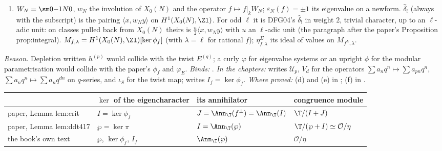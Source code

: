 \begin{convention}
\begin{enumerate}[label=(\alph*)]
for the set $S$. A parenthesised superscript is reserved for \emph{twists} of curves ($E^{(q)}$), for \emph{removing Euler factors}
($\zeta^{(N)}$, $\T^{(N)}$), for the \emph{level} of a Hecke operator when two levels are in play ($T_p^{(M)}$, $U_p^{(Mp)}$), and for the
components $\chi^{(p)}$ of a Dirichlet character; it never denotes depletion. The Frobenius twist of a curve is $C^{[r]}$.
\item $W_N=\sm0{-1}N0$, $w_N$ the involution of $X_0(N)$ and the operator $f\mapsto f|_kW_N$; $\varepsilon_N(f)=\pm1$ its eigenvalue on a newform.
$\hat\delta_!$ (always with the subscript) is the pairing $\langle x,w_Ny\rangle$ on $H^1(X_0(N),\Zl)$. For odd $\ell$ it is DFG04's $\hat\delta_!$
in weight $2$, trivial character, up to an $\ell$-adic unit: on classes pulled back from $X_0(N)$ theirs is $\frac u2\langle x,w_Ny\rangle$ with $u$ an
$\ell$-adic unit (the paragraph after the paper's Proposition prop:integral). $M_{f,\lambda}=H^1(X_0(N),\Zl)[\ker\phi_f]$ (with $\lambda=\ell$ for rational $f$); $\eta^\Sigma_{f,\lambda}$ its ideal of values on
$M_{f^\Sigma,\lambda}$.
\end{enumerate}
\end{convention}

\noindent\emph{Reason.} Depletion written $h^{(p)}$ would collide with the twist $E^{(q)}$; a curly $\varphi$ for eigenvalue systems
or an upright $\phi$ for the modular parametrisation would collide with the paper's $\phi_f$ and $\varphi_E$. \emph{Binds:}
. \emph{In the chapters:}
 writes $\mathcal U_p$, $V_d$ for the operators $\sum a_nq^n\mapsto\sum a_{pn}q^n$, $\sum a_nq^n\mapsto\sum a_nq^{dn}$ on
$q$-series, and $\iota_S$ for the twist map;  writes $I_f=\ker\phi_f$. \emph{Where proved:} (d) and (e) in
; (f) in .

\begin{center}\small
\begin{tabular}{@{}p{3.8cm}p{3.4cm}p{3.4cm}p{3.6cm}@{}}
\toprule
& $\ker$ of the eigencharacter & its annihilator & congruence module\\
\midrule
paper, Lemma lem:crit & $I=\ker\phi_f$ & $J=\Ann_\T(f^\perp)=\Ann_\T(I)$ & $\T/(I+J)$\\
paper, Lemma lem:ddt417 & $\wp=\ker\pi$ & $I=\Ann_\T(\wp)$ & $\T/(\wp+I)\simeq\mathcal O/\eta$\\
the book's own text & $\wp$, $\ker\phi_f$, $I_f$ & $\Ann_\T(\wp)$ & $\mathcal O/\eta$\\
\bottomrule
\end{tabular}
\end{center}

